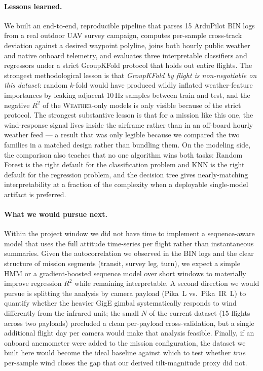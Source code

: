 \documentclass[sigconf, nonacm]{acmart}
\begin{document}
\paragraph{Lessons learned.}
We built an end-to-end, reproducible pipeline that parses 15 ArduPilot
BIN logs from a real outdoor UAV survey campaign, computes per-sample
cross-track deviation against a desired waypoint polyline, joins both
hourly public weather and native onboard telemetry, and evaluates three
interpretable classifiers and regressors under a strict GroupKFold
protocol that holds out entire flights.  The strongest methodological
lesson is that \emph{GroupKFold by flight is non-negotiable on this
dataset}: random $k$-fold would have produced wildly inflated
weather-feature importances by leaking adjacent 10\,Hz samples between
train and test, and the negative $R^2$ of the \textsc{Weather}-only
models is only visible because of the strict protocol.  The strongest
substantive lesson is that for a mission like this one, the wind-response
signal lives inside the airframe rather than in an off-board hourly
weather feed --- a result that was only legible because we compared the
two families in a matched design rather than bundling them.  On the
modeling side, the comparison also teaches that no one algorithm wins
both tasks: Random Forest is the right default for the classification
problem and KNN is the right default for the regression problem, and
the decision tree gives nearly-matching interpretability at a fraction
of the complexity when a deployable single-model artifact is preferred.

\paragraph{What we would pursue next.}
Within the project window we did not have time to implement a
sequence-aware model that uses the full attitude time-series per flight
rather than instantaneous summaries.  Given the autocorrelation we
observed in the BIN logs and the clear structure of mission segments
(transit, survey leg, turn), we expect a simple HMM or a gradient-boosted
sequence model over short windows to materially improve regression $R^2$
while remaining interpretable.  A second direction we would pursue is
splitting the analysis by camera payload (Pika~L vs.\ Pika~IR~L) to
quantify whether the heavier GigE gimbal systematically responds to
wind differently from the infrared unit; the small $N$ of the current
dataset (15 flights across two payloads) precluded a clean per-payload
cross-validation, but a single additional flight day per camera would
make that analysis feasible.  Finally, if an onboard anemometer were
added to the mission configuration, the dataset we built here would
become the ideal baseline against which to test whether \emph{true}
per-sample wind closes the gap that our derived tilt-magnitude proxy
did not.
\end{document}
